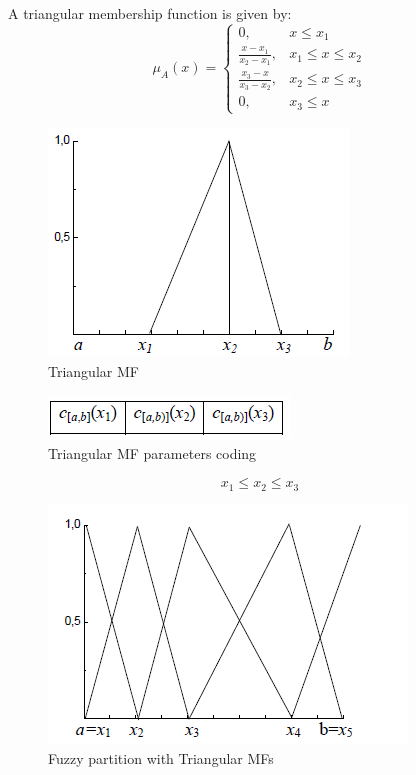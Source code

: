 \documentclass[runningheads,a4paper]{llncs}
\begin{document}
A triangular membership function is given by:
\begin{equation} 
\mu_{A}(x)= \left \{
\begin{array}{ll}
0, & x \leq x_{1}\\
\frac{x - x_{1}}{x_{2} - x_{1}}, &x_{1} \leq x \leq x_{2}  \\
\frac{x_{3} - x}{x_{3} - x_{2}}, &x_{2} \leq x \leq x_{3}  \\
0,& x_{3} \leq x 
\end{array}
\right.
\end{equation}

\begin{figure}[!h]
	\begin{center}
		\includegraphics[scale=0.90]{fig/triangulaire}
		\caption {Triangular MF}
		\label{tri}
	\end{center}
\end{figure}


\begin{figure}[!h]
	\begin{center}
		\includegraphics[scale=0.95]{fig/codage}
		\caption {Triangular MF parameters coding}
		\label{co} 
	\end{center}
\end{figure}

\begin{equation}\label{key}
x_{1} \leq x_{2} \leq x_{3}
\end{equation}

\begin{figure}[!h]
	\begin{center}
		\includegraphics[scale=0.95]{fig/vl}
		\caption {Fuzzy partition with Triangular MFs}
		\label{vl} 
	\end{center}
\end{figure}
\end{document}
